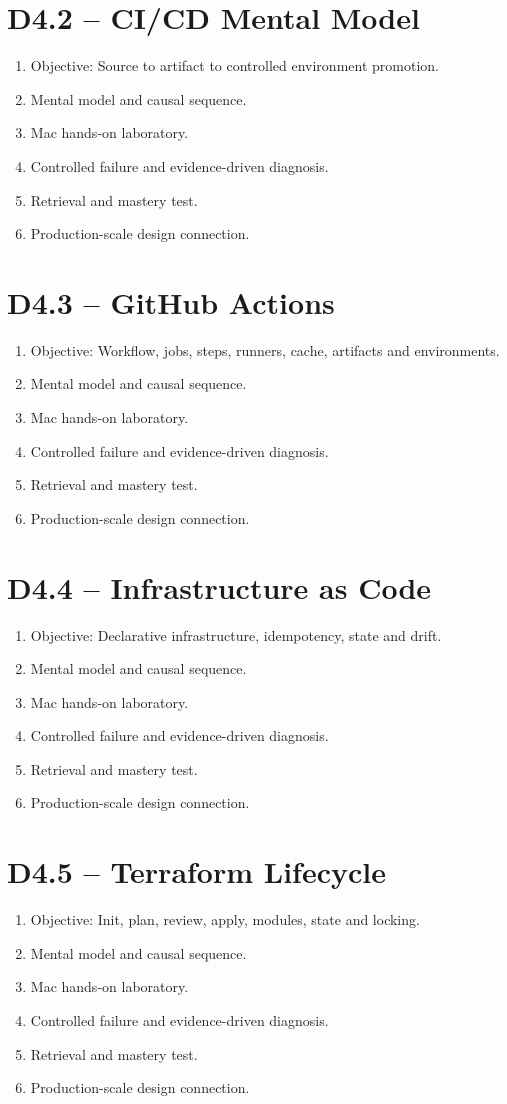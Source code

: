 \documentclass[11pt,a4paper]{book}
\begin{document}
\section{D4.2 -- CI/CD Mental Model}
\begin{enumerate}
\item Objective: Source to artifact to controlled environment promotion.
\item Mental model and causal sequence.
\item Mac hands-on laboratory.
\item Controlled failure and evidence-driven diagnosis.
\item Retrieval and mastery test.
\item Production-scale design connection.
\end{enumerate}
\section{D4.3 -- GitHub Actions}
\begin{enumerate}
\item Objective: Workflow, jobs, steps, runners, cache, artifacts and environments.
\item Mental model and causal sequence.
\item Mac hands-on laboratory.
\item Controlled failure and evidence-driven diagnosis.
\item Retrieval and mastery test.
\item Production-scale design connection.
\end{enumerate}
\section{D4.4 -- Infrastructure as Code}
\begin{enumerate}
\item Objective: Declarative infrastructure, idempotency, state and drift.
\item Mental model and causal sequence.
\item Mac hands-on laboratory.
\item Controlled failure and evidence-driven diagnosis.
\item Retrieval and mastery test.
\item Production-scale design connection.
\end{enumerate}
\section{D4.5 -- Terraform Lifecycle}
\begin{enumerate}
\item Objective: Init, plan, review, apply, modules, state and locking.
\item Mental model and causal sequence.
\item Mac hands-on laboratory.
\item Controlled failure and evidence-driven diagnosis.
\item Retrieval and mastery test.
\item Production-scale design connection.
\end{enumerate}
\end{document}
